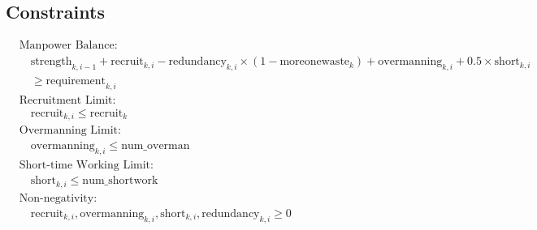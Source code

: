 \documentclass{article}
\begin{document}
\subsection*{Constraints}
\begin{align*}
    & \text{Manpower Balance:} \\
    & \quad \text{strength}_{k,i-1} + \text{recruit}_{k,i} - \text{redundancy}_{k,i} \times(1 - \text{moreonewaste}_{k}) + \text{overmanning}_{k,i} + 0.5 \times \text{short}_{k,i} \\
    & \quad \geq \text{requirement}_{k,i} \\
    & \text{Recruitment Limit:} \\
    & \quad \text{recruit}_{k,i} \leq \text{recruit}_{k} \\
    & \text{Overmanning Limit:} \\
    & \quad \text{overmanning}_{k,i} \leq \text{num\_overman} \\
    & \text{Short-time Working Limit:} \\
    & \quad \text{short}_{k,i} \leq \text{num\_shortwork} \\
    & \text{Non-negativity:} \\
    & \quad \text{recruit}_{k,i}, \text{overmanning}_{k,i}, \text{short}_{k,i}, \text{redundancy}_{k,i} \geq 0
\end{align*}
\end{document}
